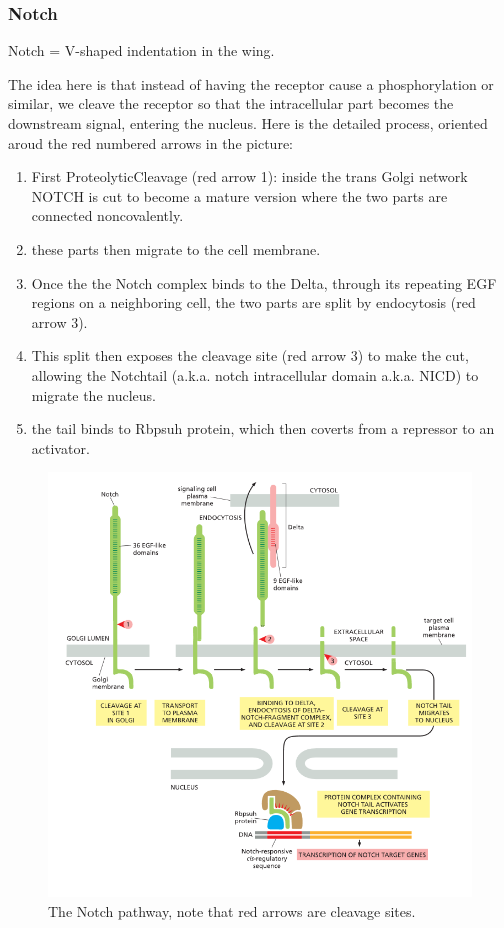\documentclass[../main.tex]{subfiles}
\begin{document}
\subsubsection{Notch}
\gls{Notch} = V-shaped indentation in the wing.

The idea here is that instead of having the receptor cause a phosphorylation or similar, we cleave the receptor so that the intracellular part becomes the downstream signal, entering the nucleus. Here is the detailed process, oriented aroud the red numbered arrows in the picture:

\begin{enumerate}
	\item First \gls{ProteolyticCleavage} (red arrow 1): inside the trans Golgi network NOTCH is cut to become a mature version where the two parts are connected noncovalently.
	\item these parts then migrate to the cell membrane. 
	\item Once the the Notch complex binds to the \gls{Delta}, through its repeating EGF regions on a neighboring cell, the two parts are split by endocytosis (red arrow 3).
	\item This split then exposes the cleavage site (red arrow 3) to make the cut, allowing the \gls{Notchtail} (a.k.a. notch intracellular domain a.k.a. NICD) to migrate the nucleus.
	\item the tail binds to \gls{Rbpsuh} protein, which then coverts from a repressor to an activator. 
\end{enumerate}

\begin{figure}[H]
	\centering
	\includegraphics[width=0.7\linewidth]{Notch_path}
	\caption{The Notch pathway, note that red arrows are cleavage sites.}
\end{figure}
\end{document}
